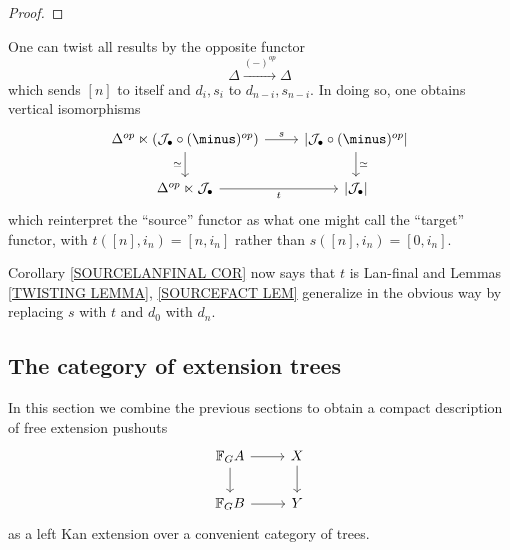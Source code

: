 \documentclass[a4paper,10pt]{article}%
\begin{document}
\begin{proof}
\end{proof}

\begin{remark}\label{DUALRESULTS REM}
  One can twist all results by the opposite functor
  \[\Delta \xrightarrow{(\minus)^{op}} \Delta\]
  which sends $[n]$ to itself and $d_i,s_i$ to $d_{n-i},s_{n-i}$.
  In doing so, one obtains vertical isomorphisms	
  \[
  \begin{tikzcd}
    \Delta^{op} \ltimes \left(\mathcal{J}_{\bullet} \circ (\minus)^{op} \right) \ar{r}{s} \ar{d}[swap]{\simeq} &
    \left|\mathcal{J}_{\bullet} \circ (\minus)^{op}\right|
    \ar{d}{\simeq}
    \\
    \Delta^{op} \ltimes \mathcal{J}_{\bullet} \ar{r}[swap]{t} &
    \left| \mathcal{J}_{\bullet} \right|
  \end{tikzcd}
  \]
  which reinterpret the ``source'' functor as what one might call the ``target'' functor, with $t([n],i_n)= [n,i_n]$ rather than 
  $s([n],i_n)= [0,i_n]$.

  Corollary \ref{SOURCELANFINAL COR} now says that $t$ is Lan-final
  and Lemmas \ref{TWISTING LEMMA}, \ref{SOURCEFACT LEM} generalize in the obvious way by replacing $s$ with $t$ and $d_0$ with $d_n$.
\end{remark}



\subsection{The category of extension trees}

In this section we combine the previous sections to obtain a compact description of free extension pushouts
\begin{equation}\label{FREEEXT EQ}
  \begin{tikzcd}
    \mathbb{F}_G A \ar{r} \ar{d} & X \ar{d}
    \\
    \mathbb{F}_G B \ar{r} & Y
  \end{tikzcd}
\end{equation}
as a left Kan extension over a convenient category of trees.
\end{document}
